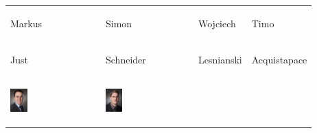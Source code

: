 \begin{table}
\renewcommand\arraystretch{1}
\begin{tabular}{p{}p{}p{}p{}}
\begin{center}Markus\end{center} & 
\begin{center}Simon\end{center} & 
\begin{center}Wojciech\end{center} & 
\begin{center}Timo\end{center}
\\
\vspace{-1.2cm}\begin{center}Just\end{center} & 
\vspace{-1.2cm}\begin{center}Schneider\end{center} & 
\vspace{-1.2cm}\begin{center}Lesnianski\end{center} & 
\vspace{-1.2cm}\begin{center}Acquistapace\end{center}
\\
\vspace{-1cm}\begin{center}\includegraphics[width=0.2\textwidth]{res/intro/Markus.png}\end{center}
& 
\vspace{-1cm}\begin{center}\includegraphics[width=0.2\textwidth]{res/intro/Simon.png}\end{center}

\end{tabular}
\end{table}
